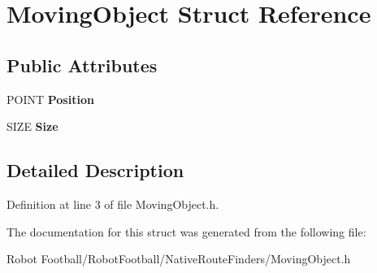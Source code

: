 \hypertarget{struct_moving_object}{\section{Moving\-Object Struct Reference}
\label{struct_moving_object}
}
\subsection*{Public Attributes}
\begin{DoxyCompactItemize}
\item 
\hypertarget{struct_moving_object_a4e8d7d7812f4552e5d6c979c00291567}{P\-O\-I\-N\-T {\bfseries Position}}\label{struct_moving_object_a4e8d7d7812f4552e5d6c979c00291567}

\item 
\hypertarget{struct_moving_object_ae5c07f8ec86eb5e70a24853234fbff60}{S\-I\-Z\-E {\bfseries Size}}\label{struct_moving_object_ae5c07f8ec86eb5e70a24853234fbff60}

\end{DoxyCompactItemize}


\subsection{Detailed Description}


Definition at line 3 of file Moving\-Object.\-h.



The documentation for this struct was generated from the following file\-:\begin{DoxyCompactItemize}
\item 
Robot Football/\-Robot\-Football/\-Native\-Route\-Finders/Moving\-Object.\-h\end{DoxyCompactItemize}
